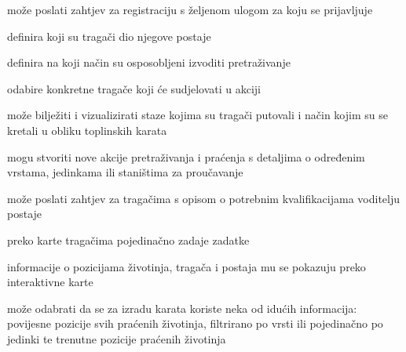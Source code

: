			
			\begin{packed_enum}
				\item  {}
				
				\begin{packed_enum}
					
					\item može poslati zahtjev za registraciju s željenom ulogom za koju se prijavljuje
					
				\end{packed_enum}
			
				\item  {}
				
				\begin{packed_enum}
					
					\item definira koji su tragači dio njegove postaje 
					\item definira na koji način su osposobljeni izvoditi pretraživanje 
					\item odabire konkretne tragače koji će sudjelovati u akciji 
					
				\end{packed_enum}
				
				\item  {}
				
				\begin{packed_enum}
					
					\item može bilježiti i vizualizirati staze kojima su tragači putovali i način kojim su se kretali u obliku toplinskih karata 
					\item mogu stvoriti nove akcije pretraživanja i praćenja s detaljima o određenim vrstama, jedinkama ili staništima za proučavanje 
					\item može poslati zahtjev za tragačima s opisom o potrebnim kvalifikacijama voditelju postaje 
					\item preko karte tragačima pojedinačno zadaje zadatke 
					\item informacije o pozicijama životinja, tragača i postaja mu se pokazuju preko interaktivne karte
					\begin{packed_enum}
					
						\item  može odabrati da se za izradu karata koriste neka od idućih informacija: povijesne pozicije svih praćenih životinja, filtrirano po vrsti ili pojedinačno po jedinki te trenutne pozicije praćenih životinja 
					

\end{packed_enum}
\end{packed_enum}
\end{packed_enum}
